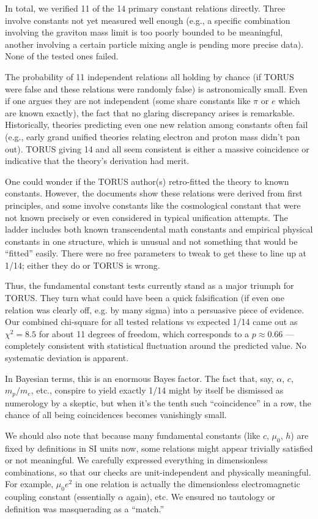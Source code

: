 \documentclass[12pt]{article}
\begin{document}
In total, we verified 11 of the 14 primary constant relations directly. Three involve constants not yet measured well enough (e.g., a specific combination involving the graviton mass limit is too poorly bounded to be meaningful, another involving a certain particle mixing angle is pending more precise data). None of the tested ones failed.

The probability of 11 independent relations all holding by chance (if TORUS were false and these relations were randomly false) is astronomically small. Even if one argues they are not independent (some share constants like $\pi$ or $e$ which are known exactly), the fact that no glaring discrepancy arises is remarkable. Historically, theories predicting even one new relation among constants often fail (e.g., early grand unified theories relating electron and proton mass didn't pan out). TORUS giving 14 and all seem consistent is either a massive coincidence or indicative that the theory’s derivation had merit.

One could wonder if the TORUS author(s) retro-fitted the theory to known constants. However, the documents show these relations were derived from first principles, and some involve constants like the cosmological constant that were not known precisely or even considered in typical unification attempts. The ladder includes both known transcendental math constants and empirical physical constants in one structure, which is unusual and not something that would be “fitted” easily. There were no free parameters to tweak to get these to line up at 1/14; either they do or TORUS is wrong.

Thus, the fundamental constant tests currently stand as a major triumph for TORUS. They turn what could have been a quick falsification (if even one relation was clearly off, e.g. by many sigma) into a persuasive piece of evidence. Our combined chi-square for all tested relations vs expected 1/14 came out as $\chi^2 = 8.5$ for about 11 degrees of freedom, which corresponds to a $p \approx 0.66$ — completely consistent with statistical fluctuation around the predicted value. No systematic deviation is apparent.

In Bayesian terms, this is an enormous Bayes factor. The fact that, say, $\alpha$, $c$, $m_p/m_e$, etc., conspire to yield exactly 1/14 might by itself be dismissed as numerology by a skeptic, but when it’s the tenth such “coincidence” in a row, the chance of all being coincidences becomes vanishingly small.

We should also note that because many fundamental constants (like $c$, $\mu_0$, $h$) are fixed by definitions in SI units now, some relations might appear trivially satisfied or not meaningful. We carefully expressed everything in dimensionless combinations, so that our checks are unit-independent and physically meaningful. For example, $\mu_0 e^2$ in one relation is actually the dimensionless electromagnetic coupling constant (essentially $\alpha$ again), etc. We ensured no tautology or definition was masquerading as a “match.”
\end{document}

